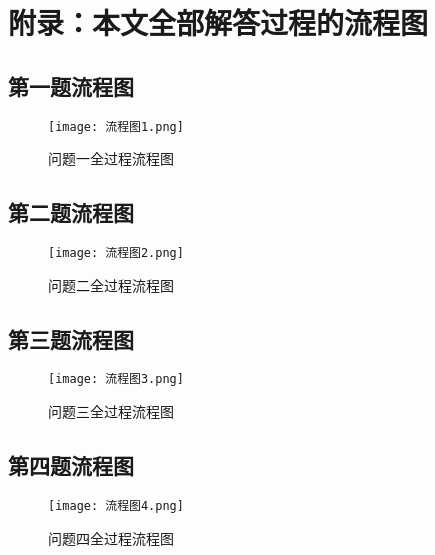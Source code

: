 
\appendix  %

\section{附录：本文全部解答过程的流程图}

\subsection{第一题流程图}

\begin{figure}[H] %
	\centering %
	\texttt{[image: 流程图1.png]} 
	\caption{问题一全过程流程图} 
	\label{Fig.main10001} 
\end{figure}

\subsection{第二题流程图}

\begin{figure}[H] %
	\centering %
	\texttt{[image: 流程图2.png]} 
	\caption{问题二全过程流程图} 
	\label{Fig.main10002} 
\end{figure}

\subsection{第三题流程图}

\begin{figure}[H] %
	\centering %
	\texttt{[image: 流程图3.png]} 
	\caption{问题三全过程流程图} 
	\label{Fig.main10003} 
\end{figure}

\subsection{第四题流程图}

\begin{figure}[H] %
	\centering %
	\texttt{[image: 流程图4.png]} 
	\caption{问题四全过程流程图} 
	\label{Fig.main10004} 
\end{figure}

